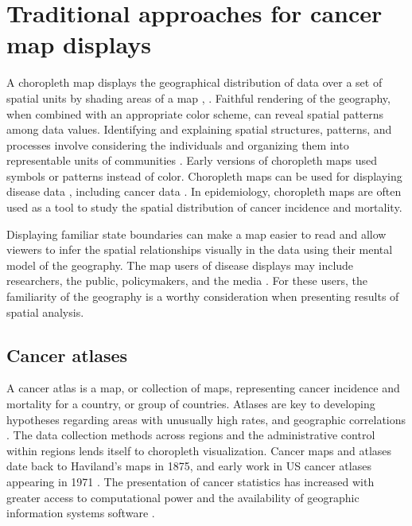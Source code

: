 \documentclass{monashthesis}
\begin{document}
\hypertarget{ch:choropleth-maps}{%
\section{Traditional approaches for cancer map displays}\label{ch:choropleth-maps}}

A choropleth map displays the geographical distribution of data over a set of spatial units by shading areas of a map \autocite{EI}, \autocite{BCM}. Faithful rendering of the geography, when combined with an appropriate color scheme, can reveal spatial patterns among data values. Identifying and explaining spatial structures, patterns, and processes involve considering the individuals and organizing them into representable units of communities \autocite{SAMGIS}. Early versions of choropleth maps used symbols or patterns instead of color. Choropleth maps can be used for displaying disease data \autocite{DMAHP}, including cancer data \autocite{CPISACA}. In epidemiology, choropleth maps are often used as a tool to study the spatial distribution of cancer incidence and mortality.

Displaying familiar state boundaries can make a map easier to read \autocite{CIBMUK} and allow viewers to infer the spatial relationships visually in the data using their mental model of the geography. The map users of disease displays may include researchers, the public, policymakers, and the media \autocite{CPISACA}. For these users, the familiarity of the geography is a worthy consideration when presenting results of spatial analysis.

\hypertarget{ch:public}{%
\subsection{Cancer atlases}\label{ch:public}}

A cancer atlas is a map, or collection of maps, representing cancer incidence and mortality for a country, or group of countries. Atlases are key to developing hypotheses regarding areas with unusually high rates, and geographic correlations \autocite{MACM}. The data collection methods across regions and the administrative control within regions lends itself to choropleth visualization. Cancer maps and atlases date back to Haviland's maps in 1875, and early work in US cancer atlases appearing in 1971 \autocite{burbank}. The presentation of cancer statistics has increased with greater access to computational power and the availability of geographic information systems software \autocite{SE}.
\end{document}
